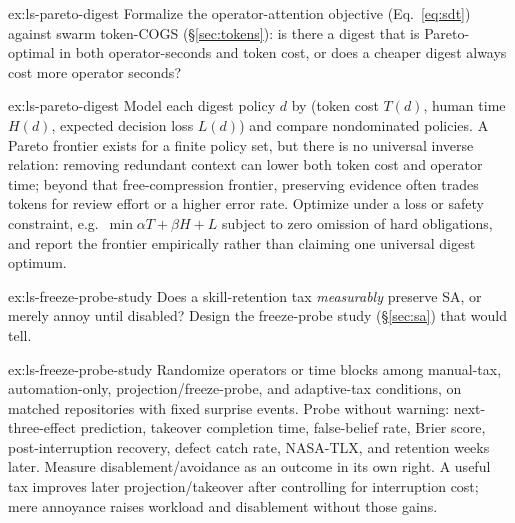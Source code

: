 \documentclass[11pt,a4paper]{article}
\theoremstyle{definition}
\theoremstyle{plain}
\begin{document}
\begin{pdexercise}[kind=Open,rating=3]{ex:ls-pareto-digest}
Formalize the operator-attention objective (Eq.~\ref{eq:sdt})
against swarm token-COGS (\S\ref{sec:tokens}): is there a digest that is
Pareto-optimal in both operator-seconds and token cost, or does a cheaper digest
always cost more operator seconds?
\end{pdexercise}
\begin{pdsolution}{ex:ls-pareto-digest}
Model each digest policy $d$ by (token cost $T(d)$, human time $H(d)$, expected decision loss $L(d)$) and compare nondominated policies. A Pareto frontier exists for a finite policy set, but there is no universal inverse relation: removing redundant context can lower both token cost and operator time; beyond that free-compression frontier, preserving evidence often trades tokens for review effort or a higher error rate. Optimize under a loss or safety constraint, e.g.\ $\min \alpha T+\beta H+L$ subject to zero omission of hard obligations, and report the frontier empirically rather than claiming one universal digest optimum.
\end{pdsolution}
\begin{pdexercise}[kind=Open,rating=3]{ex:ls-freeze-probe-study}
Does a skill-retention tax
\emph{measurably} preserve SA, or merely annoy until disabled? Design the
freeze-probe study (\S\ref{sec:sa}) that would tell.
\end{pdexercise}
\begin{pdsolution}{ex:ls-freeze-probe-study}
Randomize operators or time blocks among manual-tax, automation-only, projection/freeze-probe, and adaptive-tax conditions, on matched repositories with fixed surprise events. Probe without warning: next-three-effect prediction, takeover completion time, false-belief rate, Brier score, post-interruption recovery, defect catch rate, NASA-TLX, and retention weeks later. Measure disablement/avoidance as an outcome in its own right. A useful tax improves later projection/takeover after controlling for interruption cost; mere annoyance raises workload and disablement without those gains.
\end{pdsolution}

\end{document}
